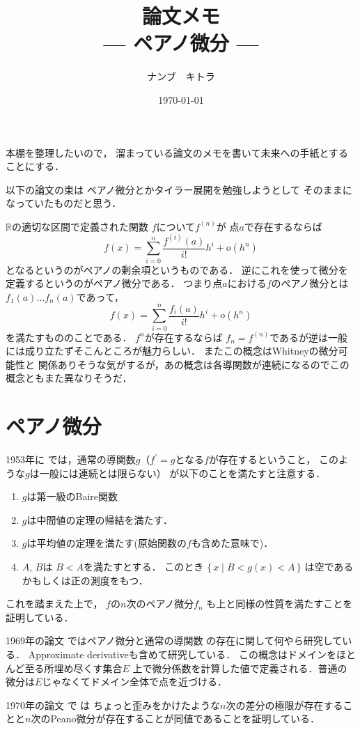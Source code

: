 \documentclass[leqno, a4paper, 12pt]{jsarticle}
\title{論文メモ
\large{\\--- ペアノ微分 ---}
}
\author{ナンブ　キトラ}
\date{\today}
\newcommand{\rr}{\mathbb{R}}
\begin{document}
\maketitle

本棚を整理したいので，
溜まっている論文のメモを書いて未来への手紙とすることにする．

以下の論文の束は
ペアノ微分とかタイラー展開を勉強しようとして
そのままになっていたものだと思う．

$\rr$の適切な区間で定義された関数
$f$について$f^{(n)}$が
点$a$で存在するならば
\[
f(x)=\sum_{i=0}^{n}\frac{f^{(i)}(a)}{i!}h^{i}+o(h^{n})
\]
となるというのがペアノの剰余項というものである．
逆にこれを使って微分を定義するというのがペアノ微分である．
つまり点$a$における$f$のペアノ微分とは
$f_{1}(a)\dots f_{n}(a)$であって，
\[
f(x)=\sum_{i=0}^{n}\frac{f_{i}(a)}{i!}h^{i}+o(h^{n})
\]
を満たすもののことである．
$f^{n}$が存在するならば
$f_{n}=f^{(n)}$であるが逆は一般には成り立たずそこんところが魅力らしい．
またこの概念はWhitneyの微分可能性と
関係ありそうな気がするが，あの概念は各導関数が連続になるのでこの概念ともまた異なりそうだ．
\section{ペアノ微分}

1953年に
\cite{MR0062207}
では，通常の導関数$g$（$f^{\prime}=g$となる$f$が存在するということ， このような$g$は一般には連続とは限らない）
が以下のことを満たすと注意する．
\begin{enumerate}[label=\textup{(\arabic*)}]
\item 
$g$は第一級のBaire関数

\item 
$g$は中間値の定理の帰結を満たす．
\item 
$g$は平均値の定理を満たす(原始関数の$f$も含めた意味で)．

\item 
$A$, $B$は
$B<A$を満たすとする．
このとき
$\{\, x\mid B<g(x)<A\, \}$
は空であるかもしくは正の測度をもつ．
\end{enumerate}
これを踏まえた上で，
$f$の$n$次のペアノ微分$f_{n}$
も上と同様の性質を満たすことを
証明している．


1969年の論文
\cite{MR0233944}
ではペアノ微分と通常の導関数
の存在に関して何やら研究している．
Approximate derivativeも含めて研究している．
この概念はドメインをほとんど至る所埋め尽くす集合$E$
上で微分係数を計算した値で定義される．普通の微分は$E$じゃなくてドメイン全体で点を近づける．

1970年の論文
\cite{MR0259041}で
は
ちょっと歪みをかけたような$n$次の差分の極限が存在することと$n$次のPeano微分が存在することが同値であることを証明している．
\end{document}
